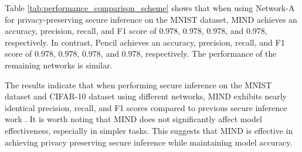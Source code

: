 \documentclass[conference]{IEEEtran}
\begin{document}
Table \ref{tab:performance_comparison_scheme} shows that when using Network-A for privacy-preserving secure inference on the MNIST dataset, MIND achieves an accuracy, precision, recall, and F1 score of 0.978, 0.978, 0.978, and 0.978, respectively.
In contrast, Pencil achieves an accuracy, precision, recall, and F1 score of 0.978, 0.978, 0.978, and 0.978, respectively. The performance of the remaining networks is similar.




The results indicate that when performing secure inference on the MNIST dataset and CIFAR-10 dataset using different networks, MIND exhibits nearly identical precision, recall, and F1 scores compared to previous secure inference work \cite{liu2024pencilprivateextensiblecollaborative}.
It is worth noting that MIND does not significantly affect model effectiveness, especially in simpler tasks. 
This suggests that MIND is effective in achieving privacy preserving secure inference while maintaining model accuracy.
\end{document}
